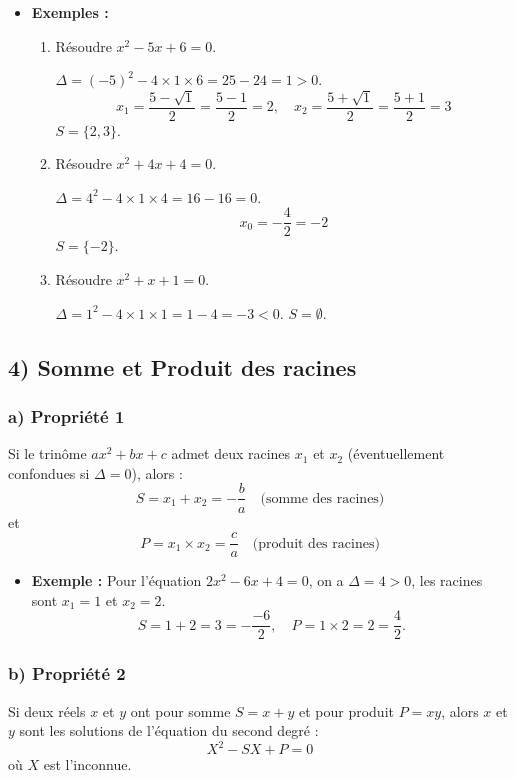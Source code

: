 \documentclass[12pt,a4paper]{article}
\newcounter{solution}
\begin{document}
\begin{itemize}
    \item \textbf{Exemples :}
    \begin{enumerate}[label=\arabic*)]
        \item Résoudre $x^2 - 5x + 6 = 0$.
        
        $\Delta = (-5)^2 - 4 \times 1 \times 6 = 25 - 24 = 1 > 0$.
        \[
        x_1 = \dfrac{5 - \sqrt{1}}{2} = \dfrac{5-1}{2} = 2, \quad
        x_2 = \dfrac{5 + \sqrt{1}}{2} = \dfrac{5+1}{2} = 3
        \]
        $S = \{2, 3\}$.
        
        \item Résoudre $x^2 + 4x + 4 = 0$.
        
        $\Delta = 4^2 - 4 \times 1 \times 4 = 16 - 16 = 0$.
        \[
        x_0 = -\dfrac{4}{2} = -2
        \]
        $S = \{-2\}$.
        
        \item Résoudre $x^2 + x + 1 = 0$.
        
        $\Delta = 1^2 - 4 \times 1 \times 1 = 1 - 4 = -3 < 0$.
        $S = \emptyset$.
    \end{enumerate}
\end{itemize}

\subsection*{\color{myred} 4) Somme et Produit des racines}

\subsubsection*{\color{myred} a) Propriété 1}
Si le trinôme $ax^2 + bx + c$ admet deux racines $x_1$ et $x_2$ (éventuellement confondues si $\Delta = 0$), alors :
\[
S = x_1 + x_2 = -\dfrac{b}{a} \quad \text{(somme des racines)}
\]
et
\[
P = x_1 \times x_2 = \dfrac{c}{a} \quad \text{(produit des racines)}
\]

\begin{itemize}
    \item \textbf{Exemple :} Pour l'équation $2x^2 - 6x + 4 = 0$, on a $\Delta = 4 > 0$, les racines sont $x_1 = 1$ et $x_2 = 2$.
    \[
    S = 1+2 = 3 = -\dfrac{-6}{2}, \quad P = 1 \times 2 = 2 = \dfrac{4}{2}.
    \]
\end{itemize}

\subsubsection*{\color{myred} b) Propriété 2}
Si deux réels $x$ et $y$ ont pour somme $S = x + y$ et pour produit $P = xy$, alors $x$ et $y$ sont les solutions de l'équation du second degré :
\[
X^2 - SX + P = 0
\]
où $X$ est l'inconnue.
\end{document}
